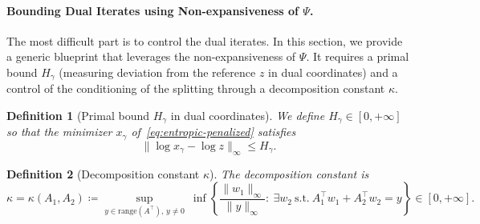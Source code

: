 \documentclass{article}
\theoremstyle{plain}
\newtheorem{definition}{Definition}[section]
\newcommand{\norm}[1]{\|#1\|}
\newcommand{\norminf}[1]{\norm{#1}_\infty}
\newcommand{\z}{z}
\begin{document}
\paragraph{Bounding Dual Iterates using Non-expansiveness of $\Psi$.}
\label{app-sec:bounding-dual}

The most difficult part is to control the dual iterates. In this section, we provide a generic blueprint that leverages the non-expansiveness of $\Psi$. It requires a primal bound $H_\gamma$ (measuring deviation from the reference $\z$ in dual coordinates) and a control of the conditioning of the splitting through a decomposition constant $\kappa$.

\begin{definition}[Primal bound $H_\gamma$ in dual coordinates]
We define $H_\gamma\in[0,+\infty]$ so that the minimizer $x_\gamma$ of~\eqref{eq:entropic-penalized} satisfies
\begin{equation}\label{app-eq:Hgamma}
  \|\log x_\gamma - \log \z\|_\infty \le H_\gamma.
\end{equation}
\end{definition}



\begin{definition}[Decomposition constant $\kappa$]
The decomposition constant is
\begin{equation}\label{app-eq:kappa}
\kappa=\kappa(A_1,A_2)  \coloneqq 
\sup_{y\in\mathrm{range}(A^\top),\,y\neq 0}
\ \inf\left\{
\frac{\norminf{w_1}}{\norminf{y}}:\ \exists w_2\ \text{s.t.}\ A_1^\top w_1 + A_2^\top w_2 = y
\right\}\in[0,+\infty].
\end{equation}
\end{definition}
\end{document}
